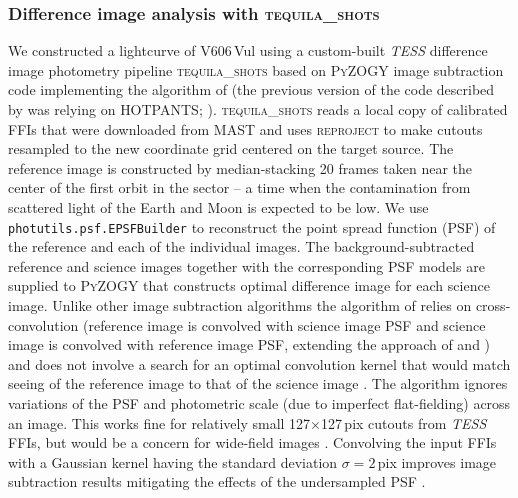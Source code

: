 \documentclass[twocolumn]{aastex631}
\newcommand{\nova}{V606\,Vul}
\begin{document}
\subsubsection{Difference image analysis with \textsc{tequila\_shots}}
\label{sec:obstesstq}

We constructed a lightcurve of \nova{} using a custom-built {\em TESS} difference image 
photometry pipeline \textsc{tequila\_shots} \citep{2020ApJ...899..136B}
based on \textsc{PyZOGY} \citep{pyzogy} image subtraction 
code implementing the algorithm of \cite{2016ApJ...830...27Z} 
(the previous version of the code described by \citealt{2020ApJ...899..136B}
was relying on \textsc{HOTPANTS}; \citealt{2015ascl.soft04004B}).
\textsc{tequila\_shots} reads a local copy of calibrated FFIs that were downloaded from 
MAST %
and uses \textsc{reproject} %
to make cutouts resampled to the new coordinate grid centered on the target source. 
The reference image is constructed by median-stacking 20 frames taken near 
the center of the first orbit in the sector -- a time when the contamination 
from scattered light of the Earth and Moon is expected to be low.
We use \texttt{photutils.psf.EPSFBuilder} \citep{2000PASP..112.1360A} to
reconstruct the point spread function (PSF) of the reference and each of the individual images.
The background-subtracted reference and science images together with the corresponding PSF models are supplied 
to \textsc{PyZOGY} that constructs optimal difference image for each science image.
%
Unlike other image subtraction algorithms
\citep{1995ASPC...77..297P,1998ApJ...503..325A,2008MNRAS.386L..77B,2021MNRAS.504.3561H} 
the algorithm of \cite{2016ApJ...830...27Z} relies on cross-convolution 
(reference image is convolved with science image PSF and science image is
convolved with reference image PSF, 
extending the approach of \citealt{2008ApJ...680..550G} and \citealt{2008ApJ...677..808Y}) 
and does not involve a search for an optimal convolution kernel that would match seeing of the reference
image to that of the science image \citep{2012MNRAS.425.1341B,2016MNRAS.457..542B}. 
%
The algorithm ignores variations of the PSF and photometric scale
(due to imperfect flat-fielding) across an image.
This works fine for relatively small 
127$\times$127\,pix cutouts from {\em TESS} FFIs, 
but would be a concern for wide-field images 
\citep{1996AJ....112.2872T,2000A&AS..144..363A,2013MNRAS.428.2275B,2022ApJ...936..157H}.
%
Convolving the input FFIs with a Gaussian kernel having the standard deviation $\sigma = 2$\,pix 
improves image subtraction results mitigating the effects of the undersampled PSF \citep[][]{2021MNRAS.500.5639V}. 
\end{document}
